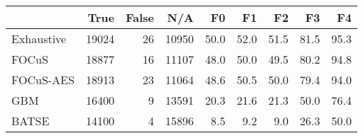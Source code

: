 \begin{tabular}{lrrrrrrrr}
\toprule
 & True & False & N/A & F0 & F1 & F2 & F3 & F4 \\
\midrule
Exhaustive & 19024 & 26 & 10950 & 50.0 & 52.0 & 51.5 & 81.5 & 95.3 \\
FOCuS & 18877 & 16 & 11107 & 48.0 & 50.0 & 49.5 & 80.2 & 94.8 \\
FOCuS-AES & 18913 & 23 & 11064 & 48.6 & 50.5 & 50.0 & 79.4 & 94.0 \\
GBM & 16400 & 9 & 13591 & 20.3 & 21.6 & 21.3 & 50.0 & 76.4 \\
BATSE & 14100 & 4 & 15896 & 8.5 & 9.2 & 9.0 & 26.3 & 50.0 \\
\bottomrule
\end{tabular}
